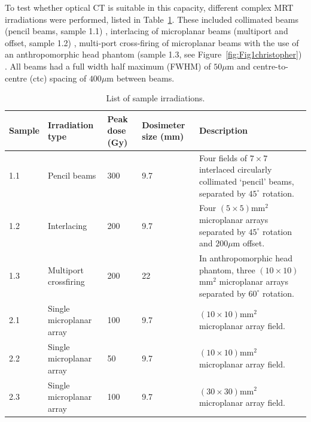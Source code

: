 	To test whether optical CT is suitable in this capacity, different complex MRT irradiations were performed, listed in Table~\ref{table:samples}. These included collimated beams (pencil beams, sample 1.1) \cite{brauer-krischeffects2010}, interlacing of microplanar beams (multiport and offset, sample 1.2) \cite{serduchigh-precision2010}, multi-port cross-firing of microplanar beams with the use of an anthropomorphic head phantom (sample 1.3, see Figure~\ref{fig:Fig1christopher}) \cite{requardt2005new}. All beams had a full width half maximum (FWHM) of $50\mu$m and centre-to-centre (ctc) spacing of $400\mu$m between beams.
	
	\begin{table}[H]
		\centering
		\begin{tabular}{ p{1.4cm} | p{3cm} |p{1cm} | p{2cm} |p{6.5cm}  }
			\textbf{Sample} & \textbf{Irradiation type} &\textbf{Peak dose (Gy)}   &\textbf{Dosimeter size (mm)} & \textbf{Description} \\ \hline
			1.1  & Pencil beams & 300  & 9.7 & Four fields of $7\times 7$ interlaced circularly collimated `pencil' beams, separated by  $45^{\circ}$ rotation. \\ \hline
			1.2  & Interlacing & 200  & 9.7 & Four $(5\times 5)$mm$^2$ microplanar arrays separated by $45^{\circ}$ rotation and $200\mu $m offset. \\ \hline
			1.3  & Multiport crossfiring & 200  & 22 & In anthropomorphic head phantom, three $(10\times 10)$mm$^2$ microplanar arrays separated by $60^{\circ}$ rotation. \\ \hline
			2.1  & Single microplanar array & 100  & 9.7 & $(10\times 10)$mm$^2$ microplanar array field. \\ \hline
			2.2  & Single microplanar array & 50  & 9.7 & $(10\times 10)$mm$^2$ microplanar array field. \\ \hline
			2.3  & Single microplanar array & 100  & 9.7 & $(30\times 30)$mm$^2$ microplanar array field. \\ %
		\end{tabular}
		\caption{List of sample irradiations.}
		\label{table:samples}
	\end{table}
	
	
